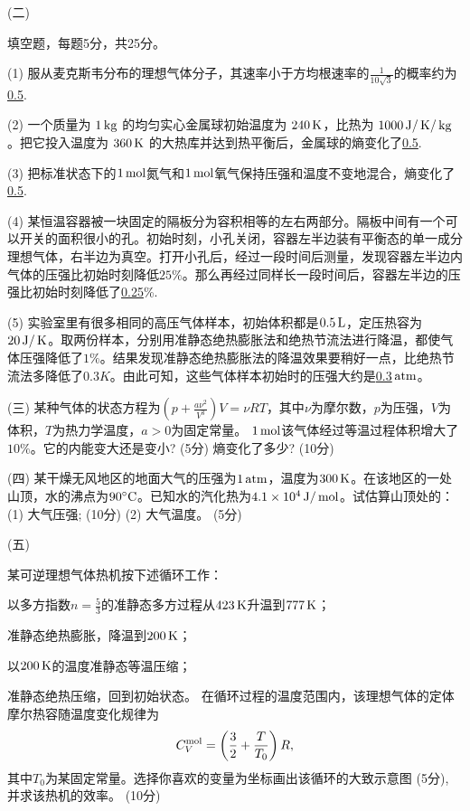 \documentclass[10pt,CJK]{article}
\def\mark#1{{\color{blue} (#1分)}}
\begin{document}
\item[(二)]{填空题，每题5分，共25分。

  \bitem
\item[(1)]{服从麦克斯韦分布的理想气体分子，其速率小于方均根速率的$\frac{1}{10\sqrt{3}}$的概率约为 \uline{0.5}.}
\item[(2)]{一个质量为 $1\,\mathrm{kg}$ 的均匀实心金属球初始温度为 $240\,\mathrm{K}$，比热为 $1000\,\mathrm{J}/\,\mathrm{K}/\,\mathrm{kg}$。把它投入温度为 $360\,\mathrm{K}$ 的大热库并达到热平衡后，金属球的熵变化了\uline{0.5}.}
\item[(3)]{把标准状态下的$1\,\mathrm{mol}$氮气和$1\,\mathrm{mol}$氧气保持压强和温度不变地混合，熵变化了\uline{0.5}.}    
\item[(4)]{某恒温容器被一块固定的隔板分为容积相等的左右两部分。隔板中间有一个可以开关的面积很小的孔。初始时刻，小孔关闭，容器左半边装有平衡态的单一成分理想气体，右半边为真空。打开小孔后，经过一段时间后测量，发现容器左半边内气体的压强比初始时刻降低$25\%$。那么再经过同样长一段时间后，容器左半边的压强比初始时刻降低了\uline{0.25}\%. }

\item[(5)]{实验室里有很多相同的高压气体样本，初始体积都是$0.5\,\mathrm{L}$，定压热容为$20\,\mathrm{J}/\,\mathrm{K}$。取两份样本，分别用准静态绝热膨胀法和绝热节流法进行降温，都使气体压强降低了$1\%$。结果发现准静态绝热膨胀法的降温效果要稍好一点，比绝热节流法多降低了$0.3K$。由此可知，这些气体样本初始时的压强大约是\uline{0.3}$\,\mathrm{atm}$。 }  

  \eitem  
}
  

  
\item[(三)]{某种气体的状态方程为$\left(p+\frac{a\nu^2}{V^3}\right)V = \nu R T$，其中$\nu$为摩尔数，$p$为压强，$V$为体积，$T$为热力学温度，$a>0$为固定常量。 $1\,\mathrm{mol}$该气体经过等温过程体积增大了$10\%$。它的内能变大还是变小?\mark{5} 熵变化了多少? \mark{10}
    \vspace{4.5in}
  }


\item[(四)]{某干燥无风地区的地面大气的压强为$1\,\mathrm{atm}$，温度为$300\,\mathrm{K}$。在该地区的一处山顶，水的沸点为$90^\circ \mathrm{C}$。已知水的汽化热为$4.1\times 10^4\,\mathrm{J}/\,\mathrm{mol}$。试估算山顶处的：(1) 大气压强; \mark{10} (2) 大气温度。\mark{5}
\vspace{3.5in}
}
  
  
  \item[(五)]{某可逆理想气体热机按下述循环工作：
      \bitem
    \item{以多方指数$n=\frac{5}{3}$的准静态多方过程从$423\,\mathrm{K}$升温到$777\,\mathrm{K}$；}
    \item{准静态绝热膨胀，降温到$200\,\mathrm{K}$；}
    \item{以$200\,\mathrm{K}$的温度准静态等温压缩；}
    \item{准静态绝热压缩，回到初始状态。}      
      \eitem
      在循环过程的温度范围内，该理想气体的定体摩尔热容随温度变化规律为
      $$C_V^{\rm mol} = \left(\frac{3}{2} + \frac{T}{T_0}\right)R,$$
      其中$T_0$为某固定常量。选择你喜欢的变量为坐标画出该循环的大致示意图\mark{5}, 并求该热机的效率。 \mark{10}
  }  

\eitem


\ech
\end{document}
